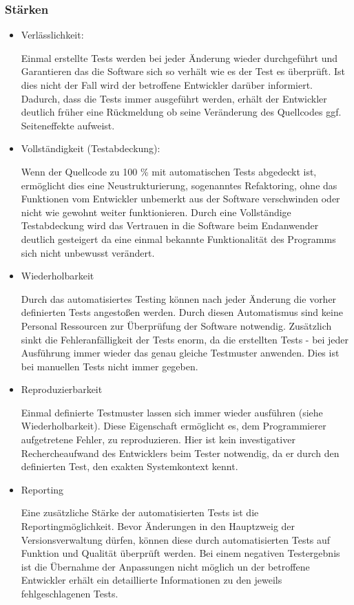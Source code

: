 \subsubsection{Stärken}
\begin{itemize}	
	\item Verlässlichkeit:
	
	Einmal erstellte Tests werden bei jeder Änderung wieder durchgeführt und Garantieren das die Software sich so verhält wie es der Test es überprüft. Ist dies nicht der Fall wird der betroffene Entwickler darüber informiert. Dadurch, dass die Tests immer ausgeführt werden, erhält der Entwickler deutlich früher eine Rückmeldung ob seine Veränderung des Quellcodes ggf. Seiteneffekte aufweist.
	
	\item Vollständigkeit (Testabdeckung):
	
	Wenn der Quellcode zu 100 \% mit automatischen Tests abgedeckt ist, ermöglicht dies eine Neustrukturierung, sogenanntes Refaktoring, ohne das Funktionen vom Entwickler unbemerkt aus der Software verschwinden oder nicht wie gewohnt weiter funktionieren. Durch eine Vollständige Testabdeckung wird das Vertrauen in die Software beim Endanwender deutlich gesteigert da eine einmal bekannte Funktionalität des Programms sich nicht unbewusst verändert.
	
	\item Wiederholbarkeit
	
	Durch das automatisiertes Testing können nach jeder Änderung die vorher definierten Tests angestoßen werden. Durch diesen Automatismus sind keine Personal Ressourcen zur Überprüfung der Software notwendig. Zusätzlich sinkt die Fehleranfälligkeit der Tests enorm, da die erstellten Tests - bei jeder Ausführung immer wieder das genau gleiche Testmuster anwenden. Dies ist bei manuellen Tests nicht immer gegeben.
	
	\item Reproduzierbarkeit
	
	Einmal definierte Testmuster lassen sich immer wieder ausführen (siehe Wiederholbarkeit). Diese Eigenschaft ermöglicht es, dem Programmierer aufgetretene Fehler, zu reproduzieren. Hier ist kein investigativer Rechercheaufwand des Entwicklers beim Tester notwendig, da er durch den definierten Test, den exakten Systemkontext kennt.
	
	\item Reporting
	
	Eine zusätzliche Stärke der automatisierten Tests ist die Reportingmöglichkeit. Bevor Änderungen in den Hauptzweig der Versionsverwaltung dürfen, können diese durch automatisierten Tests auf Funktion und Qualität überprüft werden. Bei einem negativen Testergebnis ist die Übernahme der Anpassungen nicht möglich un der betroffene Entwickler erhält ein detaillierte Informationen zu den jeweils fehlgeschlagenen Tests.
	

\end{itemize}
